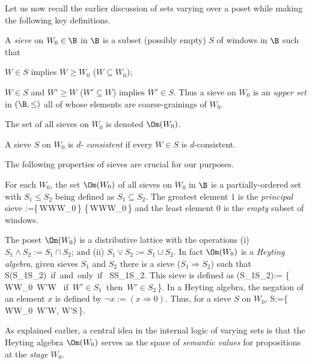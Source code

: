 	Let us now recall the earlier discussion of
sets varying over a poset while making the following key definitions.

\begin{defn}
\item  A {\em sieve\/} on $W_0\in\B$ in $\B$ is a
subset (possibly empty) $S$ of windows in $\B$ such that
		\be 
			\item $W\in S$ implies $W\geq W_0$ (\ie $W\subseteq
					W_0$); 

			\item $W\in S$ and $W'\geq W$ (\ie $W'\subseteq W$)
					implies $W'\in S$.  
		\ee 
Thus a sieve on $W_0$ is an {\em upper
set\/} in $(\B,\leq)$ all of whose elements are coarse-grainings of
$W_0$. 

	The set of all sieves on $W_0$ is denoted $\Om(W_0)$.  
	
\item A sieve $S$ on $W_0$ is $d$-{\em
consistent\/} if every $W\in S$ is $d$-consistent.

\end{defn}
	
\noindent
The following properties of sieves are crucial for our purposes.
\be
	\item For each $W_0$, the set $\Om(W_0)$ of all sieves on $W_0$ in
$\B$ is a partially-ordered set with $S_1\leq S_2$ being defined as
$S_1\subseteq S_2$. The greatest element $1$ is the {\em
principal\/} sieve
		\beq
				:=\{\,W\in\B\mid W\geq W_0\,\}\equiv
						\{\,W\in\B\mid W\subseteq W_0\,\}
		\eeq
and the least element $0$ is the {\em empty\/} subset of windows.

	\item {The poset $\Om(W_0)$ is a distributive lattice with the
operations (i) $S_1\land S_2:=S_1\cap S_2$; and (ii) $S_1\lor
S_2:=S_1\cup S_2$. In fact $\Om(W_0)$ is a {\em Heyting algebra\/},
\ie given sieves $S_1$ and $S_2$ there is a sieve ($S_1\Rightarrow
S_2$) such that
\beq
		S\leq (S_1\Rightarrow S_2){\rm\ if\ and\ only\ if\ }
				S\land S_1\leq S_2.	
\eeq
This sieve is defined as
\beq
	(S_1\Rightarrow S_2):=
	\{\,W\subseteq W_0\mid\forall\, W'\subseteq W
			\mbox{ if $W'\in S_1$ then $W'\in S_2$}\,\}.
										\label{Def:S1-implies-S2}
\eeq
In a Heyting algebra, the negation of an element $x$ is defined by
$\neg x:=(x\Rightarrow 0)$. Thus, for a sieve $S$ on $W_0$,
\beq
	\neg S:=\{\,W\subseteq W_0\mid\forall\, W'\subseteq W,
				 W'\not\in S\,\}.						\label{Def:negS}
\eeq

	As explained earlier, a central idea in the internal logic of
varying sets is that the Heyting algebra $\Om(W_0)$ serves as the
space of {\em semantic values\/} for propositions at the {\em
stage \/} $W_0$.
		}

